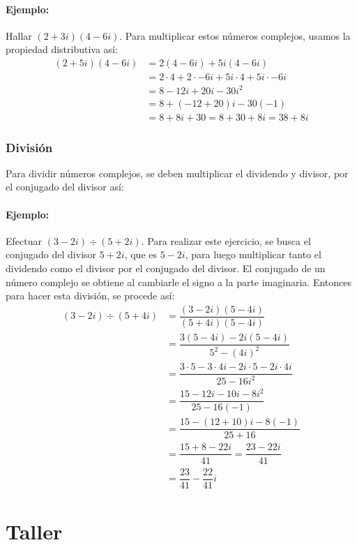 \documentclass[letterpaper]{article}
\begin{document}
\begin{multicols}{2}
  \paragraph{Ejemplo:} Hallar $ (2+3i)(4-6i) $. Para multiplicar estos números complejos, usamos la propiedad distributiva así:
  \begin{align*}
  (2+5i)(4-6i)&=2(4-6i)+5i(4-6i)\\
  &=2\cdot4+2\cdot-6i+5i\cdot4+5i\cdot-6i\\
  &=8-12i+20i-30i^2\\
  &=8+(-12+20)i-30(-1)\\
  &=8+8i+30=8+30+8i=38+8i
  \end{align*}
  \subsubsection{División}
  Para dividir números complejos, se deben multiplicar el dividendo y divisor, por el conjugado del divisor así:
  \paragraph{Ejemplo:} Efectuar $ (3-2i)\div(5+2i)$. Para realizar este ejercicio, se busca el conjugado del divisor $ 5+2i $, que es $ 5-2i $, para luego multiplicar tanto el dividendo como el divisor por el conjugado del divisor. El conjugado de un número complejo se obtiene al cambiarle el signo a la parte imaginaria. Entonces para hacer esta división, se procede así:
  \begin{align*}
  (3-2i)\div(5+4i)&=\dfrac{(3-2i)(5-4i)}{(5+4i)(5-4i)}\\
  &=\dfrac{3(5-4i)-2i(5-4i)}{5^2-(4i)^2}\\
  &=\dfrac{3\cdot5-3\cdot4i-2i\cdot5-2i\cdot4i}{25-16i^2}\\
  &=\dfrac{15-12i-10i-8i^2}{25-16(-1)}\\
  &=\dfrac{15-(12+10)i-8(-1)}{25+16}\\
  &=\dfrac{15+8-22i}{41}=\dfrac{23-22i}{41}\\
  &=\dfrac{23}{41}-\dfrac{22}{41}i
  \end{align*}
  \section{Taller}

\end{multicols}
\end{document}
